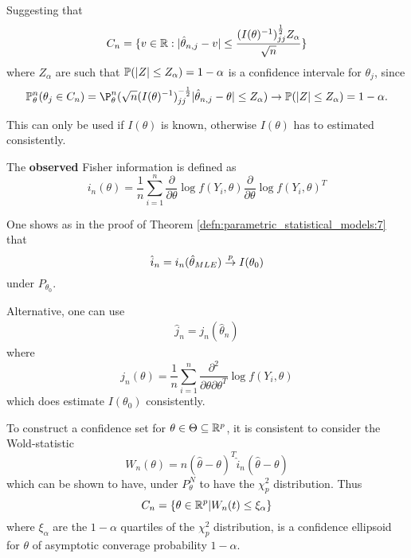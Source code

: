 Suggesting that
\begin{align}
  \label{eq:69}
  C_{n} = \{ v \in \mathbb{R} : | \hat \theta_{n, j}  - v | \leq
  \frac{(I(\theta)^{-1})^{\frac{1}{2}}_{jj} Z_{\alpha}}{\sqrt{n}} \}
\end{align} where $Z_{\alpha}$ are such that $\Prob(|Z| \leq
Z_{\alpha}) = 1 - \alpha$ is a confidence intervale for $\theta_{j}$,
since
\begin{align}
  \label{eq:70}
  \Prob_{\theta}^{n}(\theta_{j} \in C_{n}) =
  \P_{\theta}^{n}(\sqrt{n}(I(\theta)^{-1})^{-\frac{1}{2}}_{jj} | \hat
  \theta_{n, j} - \theta| \leq Z_{\alpha}) \rightarrow \Prob{|Z| \leq
    Z_{\alpha}} = 1 - \alpha.
\end{align}

This can only be used if $I(\theta)$ is known, otherwise $I(\theta)$
has to estimated consistently.

\begin{defn}
  \label{defn:parametric_statistical_models:8}
  The \textbf{observed} Fisher information is defined as
  \begin{equation}
    \label{eq:71}
    i_{n}(\theta) = \frac{1}{n} \sum_{i=1}^{n}
    \frac{\partial}{\partial \theta} \log f(Y_{i}, \theta)
    \frac{\partial}{\partial \theta} \log f(Y_{i}, \theta)^{T}
  \end{equation}

  One shows as in the proof of Theorem
  \ref{defn:parametric_statistical_models:7} that
  \begin{equation}
    \label{eq:72}
    \hat i_{n} = i_{n}(\hat \theta_{MLE}) \overset{p}{\rightarrow} I(\theta_{0})
  \end{equation} under $P_{\theta_{0}}$.

  Alternative, one can use
  \begin{align}
    \label{eq:73}
    \hat j_{n} = j_{n}(\hat \theta_{n})
  \end{align} where
  \begin{equation}
    \label{eq:74}
    j_{n}(\theta) = \frac{1}{n} \sum_{i=1}^{n}
    \frac{\partial^{2}}{\partial \theta \partial \theta^{T}} \log
    f(Y_{i}, \theta)
  \end{equation} which does estimate $I(\theta_{0})$ consistently.
\end{defn}

To construct a confidence set for $\theta \in \Theta \subseteq
\mathbb{R}^{p}$, it is consistent to consider the Wold-statistic
\begin{equation}
  \label{eq:75}
  W_{n}(\theta) = n(\hat \theta - \theta)^{T} \hat i_{n}(\hat \theta - \theta)
\end{equation} which can be shown to have, under $P_{\theta}^{N}$ to
have the $\chi^{2}_{p}$ distribution. Thus
\begin{equation}
  \label{eq:76}
  C_{n} = \{ \theta \in \mathbb{R}^{p} | W_{n}(t) \leq \xi_{\alpha} \}
\end{equation} where $\xi_{\alpha}$ are the $1-\alpha$ quartiles of
the $\chi^{2}_{p}$ distribution, is a confidence ellipsoid for
$\theta$ of asymptotic converage probability $1-\alpha$.

